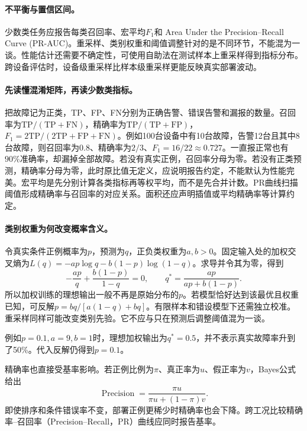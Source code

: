 \paragraph{不平衡与置信区间。}
少数类任务应报告每类召回率、宏平均$F_1$和 Area Under the Precision--Recall Curve (PR-AUC)。重采样、类别权重和阈值调整针对的是不同环节，不能混为一谈。性能估计还需要不确定性，可使用自助法在测试样本上重采样得到指标分布。跨设备评估时，设备级重采样比样本级重采样更能反映真实部署波动。

\paragraph{先读懂混淆矩阵，再读少数类指标。}
把故障记为正类，TP、FP、FN分别为正确告警、错误告警和漏报的数量。召回率为$\mathrm{TP}/(\mathrm{TP}+\mathrm{FN})$，精确率为$\mathrm{TP}/(\mathrm{TP}+\mathrm{FP})$，$F_1=2\mathrm{TP}/(2\mathrm{TP}+\mathrm{FP}+\mathrm{FN})$。例如100台设备中有10台故障，告警12台且其中8台故障，则召回率为$0.8$、精确率为$2/3$、$F_1=16/22\approx0.727$。一直报正常也有$90\%$准确率，却漏掉全部故障。若没有真实正例，召回率分母为零。若没有正类预测，精确率分母为零，此时原比值无定义，应说明报告约定，不能默认为性能完美。宏平均是先分别计算各类指标再等权平均，而不是先合并计数。PR曲线扫描阈值形成精确率与召回率的对应关系。面积还应声明插值或平均精确率等计算约定。

\paragraph{类别权重为何改变概率含义。}
令真实条件正例概率为$p$，预测为$q$，正负类权重为$a,b>0$。固定输入处的加权交叉熵为$L(q)=-ap\log q-b(1-p)\log(1-q)$。求导并令其为零，得到
\begin{equation}
 -\frac{ap}{q}+\frac{b(1-p)}{1-q}=0,
 \qquad q^*=\frac{ap}{ap+b(1-p)}.
\end{equation}
所以加权训练的理想输出一般不再是原始分布的$p$。若模型恰好达到该最优且权重已知，可反解$p=bq/[a(1-q)+bq]$。有限样本和错设模型下还需独立校准。重采样同样可能改变类别先验。它不应与只在预测后调整阈值混为一谈。

例如$p=0.1,a=9,b=1$时，理想加权输出为$q^*=0.5$，并不表示真实故障率升到了50\%。代入反解仍得到$p=0.1$。

精确率也直接受基率影响。若正例比例为$\pi$、真正率为$u$、假正率为$v$，Bayes公式给出
\begin{equation}
 \operatorname{Precision}=\frac{\pi u}{\pi u+(1-\pi)v}.
\end{equation}
即使排序和条件错误率不变，部署正例更稀少时精确率也会下降。跨工况比较精确率--召回率（Precision--Recall，PR）曲线应同时报告基率。

